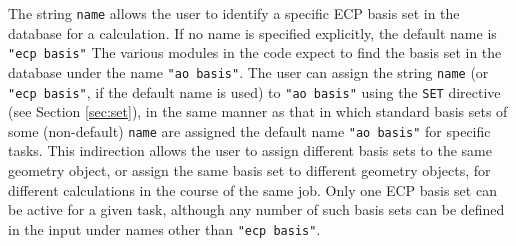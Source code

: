 % 
% 
% 

The string \verb+name+ allows the user to identify a specific ECP basis set
in the database for a calculation.  If no name is specified explicitly, the
default name is  \verb+"ecp basis"+  The various modules in the code expect 
to find the
basis set in the database under the name \verb+"ao basis"+.  The user can
assign the string \verb+name+ (or \verb+"ecp basis"+, if the default name 
is used) to \verb+"ao basis"+ using the \verb+SET+
directive (see Section \ref{sec:set}), in the same manner as that in
which standard basis sets of some (non-default) \verb+name+ 
are assigned the default name \verb+"ao basis"+ 
for specific tasks.  This indirection allows the user to assign different
basis sets to the same geometry object, or assign the same basis set to 
different geometry objects, for different calculations in
the course of the same job.  Only one ECP basis set can be active for a
given task, although any number of such basis sets can be defined in the
input under names other than \verb+"ecp basis"+.

